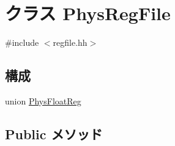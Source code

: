 \hypertarget{classPhysRegFile}{
\section{クラス PhysRegFile}
\label{classPhysRegFile}
}


{\ttfamily \#include $<$regfile.hh$>$}\subsection*{構成}
\begin{DoxyCompactItemize}
\item 
union \hyperlink{unionPhysRegFile_1_1PhysFloatReg}{PhysFloatReg}
\end{DoxyCompactItemize}
\subsection*{Public メソッド}
